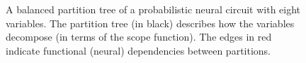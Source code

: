 \documentclass[letterpaper]{article} %
\begin{document}
\begin{figure}[t]
\begin{minipage}[c]{\linewidth}
\begin{tikzpicture}



        \end{tikzpicture}
    \end{minipage}
    \caption{A balanced partition tree of a probabilistic neural circuit with eight variables. The partition tree (in black) describes how the variables decompose (in terms of the scope function). The edges in red indicate functional (neural) dependencies between partitions.}
    \label{fig:partition_graph}
\end{figure}
\end{document}

